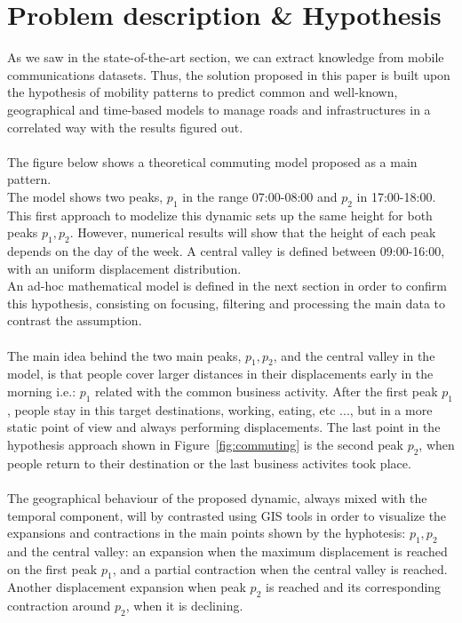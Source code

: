\newpage

\section{Problem description \& Hypothesis}
As we saw in the state-of-the-art section, we can extract knowledge from mobile communications datasets. Thus, the solution proposed in this paper is built upon the hypothesis of mobility patterns to predict common and well-known, geographical and time-based models to manage roads and infrastructures in a correlated way with the results figured out.
\\
\\
The figure below shows a theoretical commuting model proposed as a main pattern. 
\\
The model shows two peaks, $p_1$ in the range 07:00-08:00 and $p_2$ in 17:00-18:00. This first approach to modelize this dynamic sets up the same height for both peaks $p_1, p_2$. However, numerical results will show that the height of each peak depends on the day of the week. A central valley is defined between 09:00-16:00, with an uniform displacement distribution.
\\
An ad-hoc mathematical model is defined in the next section in order to confirm this hypothesis, consisting on focusing, filtering and processing the main data to contrast the assumption.
\\
\\
The main idea behind the two main peaks, $p_1, p_2$, and the central valley in the model, is that people cover larger distances in their displacements early in the morning i.e.: $p_1$ related with the common business activity. After the first peak $p_1$, people stay in this target destinations, working, eating, etc ..., but in a more static point of view and always performing displacements. The last point in the hypothesis approach shown in Figure~\ref{fig:commuting} is the second peak $p_2$, when people return to their destination or the last business activites took place.
\\
\\
The geographical behaviour of the proposed dynamic, always mixed with the temporal component, will by contrasted using GIS tools in order to visualize the expansions and contractions in the main points shown by the hyphotesis: $p_1, p_2$ and the central valley: an expansion when the maximum displacement is reached on the first peak $p_1$, and a partial contraction when the central valley is reached. Another displacement expansion when peak $p_2$ is reached and its corresponding contraction around $p_2$, when it is declining.


